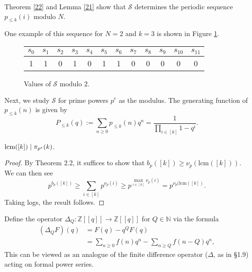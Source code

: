 \documentclass[12pt]{article}
\newcommand{\Z}{\mathbb{Z}}
\newcommand{\N}{\mathbb{N}}
\newcommand{\eqdef}{:=}
\begin{document}
Theorem \ref{22} and Lemma \ref{21} show that $\mathcal{S}$ determines the periodic sequence $p_{\le k}(i)$ modulo $N$.

\begin{example}
One example of this sequence for $N=2$ and $k=3$ is shown in Figure \ref{table}.
\begin{figure}[ht]
\begin{center}

 \begin{tabular}{|c c c c c c c c c c c c|} 
 \hline
 $s_0$ & $s_1$ & $s_2$ & $s_3$ & $s_4$ & $s_5$ & $s_6$ & $s_7$ & $s_8$ & $s_9$ & $s_{10}$ & $s_{11}$  \\ [0.5ex] 
 \hline
 1 & 1 & 0 & 1 & 0 & 1 & 1 & 0 & 0 & 0 & 0 & 0 \\ 
 \hline
\end{tabular}
\caption{Values of $\mathcal{S}$ modulo $2$.}
\label{table}
\end{center}
\end{figure}

\end{example}

Next, we study $\mathcal{S}$ for prime powers $p^e$ as the modulus. The generating function of $p_{\le k}(n)$ is given by
\[P_{\le k}(q) \eqdef \sum_{n\ge 0}{p_{\le k}(n)q^n} = \frac{1}{\prod_{i\in[k]}{1-q^i}}.\]

\begin{lemma} $\textup{lcm}([k]) \mid \pi_{p^e}(k) $.
\label{24}
\end{lemma}

\begin{proof}
By Theorem 2.2, it suffices to show that $b_p([k]) \ge \nu_p(\text{lcm}([k]))$. We can then see
\[p^{b_p([k])} \ge \sum_{i\in[k]}{p^{\nu_p(i)}} \ge p^{\max_{i \in [k]}{\nu_p(i)}} = p^{\nu_p(\text{lcm}([k])}.\]
Taking logs, the result follows.
\end{proof}

\begin{definition}
Define the operator $\Delta_{Q} : \Z[[q]] \rightarrow \Z[[q]]$ for $Q \in \N$ via the formula \begin{align*}
    (\Delta_{Q} F)(q)
    &= F(q) - q^{Q} F(q) \\
    &= \sum_{n\ge 0}{f(n)q^n} - \sum_{n\ge Q}{f(n-Q)q^n},
\end{align*}
This can be viewed as an analogue of the finite difference operator ($\Delta$, as in \cite{stanley} \S 1.9) acting on formal power series.
\label{25}
\end{definition}
\end{document}
